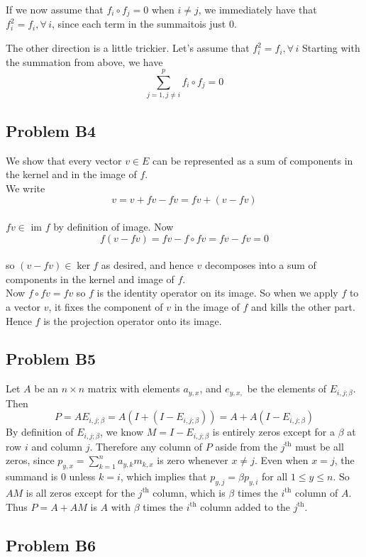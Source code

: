 \documentclass{article}
\begin{document}
If we now assume that $f_i \circ f_j = 0$ when $i \neq j$, we immediately have
that $f_i^2 = f_i, \forall\, i$, since each term in the summaitois just 0.

The other direction is a little trickier. Let's assume that $f_i^2  = f_i,
\forall\, i$
Starting with the summation from above, we have
\[\sum_{j=1,j \neq i}^p f_i \circ f_j = 0 \]

\subsection{Problem B4}
We show that every vector $v\in E$ can be represented as a sum of components in the kernel and in the image of $f$. 
\\We write 
\[v = v + fv - fv = fv + (v - fv)\]
\\$fv\in $ im $f$ by definition of image. Now 
\[f(v-fv)=fv-f\circ fv=fv-fv=0\]
\\so $(v-fv)\in \ker f$ as desired, and hence $v$ decomposes into a sum of components in the kernel and image of $f$. 
\\Now $f\circ fv=fv$ so $f$ is the identity operator on its image. So when we apply $f$ to a vector $v$, it fixes the component of $v$ in the image of $f$ and kills the other part. Hence $f$ is the projection operator onto its image.

\subsection{Problem B5}
Let $A$ be an $n\times n$ matrix with elements $a_{y,x}$, and $e_{y,x,}$ be the
elements of $E_{i,j;\beta}$.
Then 
\[P = AE_{i,j;\beta} = A(I + (I - E_{i,j;\beta})) = A + A(I - E_{i,j;\beta})\]
By definition of $E_{i,j;\beta}$, we know $M = I - E_{i,j;\beta}$ is entirely
zeros except for a $\beta$ at row $i$ and column $j$.
Therefore any column of $P$ aside from the $j^\textrm{th}$ must be all zeros,
since $p_{y,x} = \sum_{k=1}^n a_{y,k}m_{k,x}$ is zero whenever $x \neq j$.
Even when $x = j$, the summand is 0 unless $k = i$, which implies that $p_{y,j}
= \beta p_{y,i}$ for all $1 \leq y \leq n$.
So $AM$ is all zeros except for the $j^\textrm{th}$ column, which is $\beta$
times the $i^\textrm{th}$ column of $A$.
Thus $P = A + AM$ is $A$ with $\beta$ times the $i^\textrm{th}$ column added to
the $j^\textrm{th}$.

\subsection{Problem B6}
\end{document}
